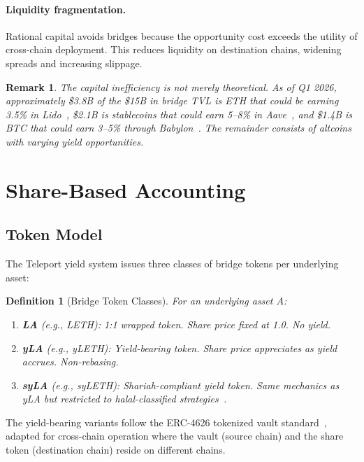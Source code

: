 \documentclass[11pt,twocolumn]{article}
\newtheorem{definition}{Definition}[section]
\newtheorem{remark}{Remark}[section]
\begin{document}
\paragraph{Liquidity fragmentation.} Rational capital avoids bridges because the opportunity cost exceeds the utility of cross-chain deployment. This reduces liquidity on destination chains, widening spreads and increasing slippage.

\begin{remark}
The capital inefficiency is not merely theoretical. As of Q1 2026, approximately \$3.8B of the \$15B in bridge TVL is ETH that could be earning 3.5\% in Lido~\cite{lidofinance}, \$2.1B is stablecoins that could earn 5--8\% in Aave~\cite{aavev3}, and \$1.4B is BTC that could earn 3--5\% through Babylon~\cite{babylon2024}. The remainder consists of altcoins with varying yield opportunities.
\end{remark}

\section{Share-Based Accounting}\label{sec:share}

\subsection{Token Model}

The Teleport yield system issues three classes of bridge tokens per underlying asset:

\begin{definition}[Bridge Token Classes]
For an underlying asset $A$:
\begin{enumerate}[nosep]
  \item \textbf{LA} (e.g., LETH): 1:1 wrapped token. Share price fixed at 1.0. No yield.
  \item \textbf{yLA} (e.g., yLETH): Yield-bearing token. Share price appreciates as yield accrues. Non-rebasing.
  \item \textbf{syLA} (e.g., syLETH): Shariah-compliant yield token. Same mechanics as yLA but restricted to halal-classified strategies~\cite{luxteleport}.
\end{enumerate}
\end{definition}

The yield-bearing variants follow the ERC-4626 tokenized vault standard~\cite{erc4626}, adapted for cross-chain operation where the vault (source chain) and the share token (destination chain) reside on different chains.
\end{document}
